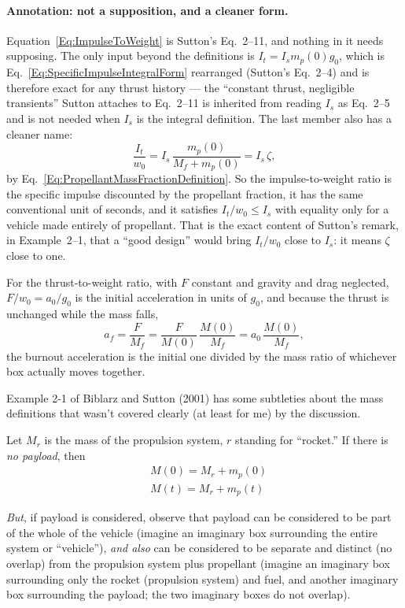 \paragraph*{Annotation: not a supposition, and a cleaner form.}
Equation~\ref{Eq:ImpulseToWeight} is Sutton's Eq.~2--11, and nothing in it
needs supposing. The only input beyond the definitions is
$I_t=I_sm_p(0)g_0$, which is Eq.~\ref{Eq:SpecificImpulseIntegralForm}
rearranged (Sutton's Eq.~2--4) and is therefore exact for any thrust
history --- the ``constant thrust, negligible transients'' Sutton attaches to
Eq.~2--11 is inherited from reading $I_s$ as Eq.~2--5 and is not needed when
$I_s$ is the integral definition. The last member also has a cleaner name:
\begin{equation}\label{Eq:ImpulseToWeightIsIsZeta}
 \frac{I_t}{w_0}
 =I_s\,\frac{m_p(0)}{M_f+m_p(0)}
 =I_s\,\zeta ,
\end{equation}
by Eq.~\ref{Eq:PropellantMassFractionDefinition}. So the impulse-to-weight
ratio is the specific impulse discounted by the propellant fraction, it has
the same conventional unit of seconds, and it satisfies $I_t/w_0\le I_s$ with
equality only for a vehicle made entirely of propellant. That is the exact
content of Sutton's remark, in Example~2--1, that a ``good design'' would
bring $I_t/w_0$ close to $I_s$: it means $\zeta$ close to one.

For the thrust-to-weight ratio, with $F$ constant and gravity and drag
neglected, $F/w_0=a_0/g_0$ is the initial acceleration in units of $g_0$, and
because the thrust is unchanged while the mass falls,
\begin{equation}\label{Eq:BurnoutAcceleration}
 a_f=\frac{F}{M_f}=\frac{F}{M(0)}\,\frac{M(0)}{M_f}
 =a_0\,\frac{M(0)}{M_f} ,
\end{equation}
the burnout acceleration is the initial one divided by the mass ratio of
whichever box actually moves together.

Example 2-1 of Biblarz and Sutton (2001) \cite{GSuttonOBiblarz2001} has some
subtleties about the mass definitions that wasn't covered clearly (at least
for me) by the discussion.

Let $M_r$ is the mass of the propulsion system, $r$ standing for ``rocket.''
If there is \emph{no payload}, then
\[
\begin{aligned}
& M(0) = M_r + m_p(0) \\
& M(t) = M_r + m_p(t)
\end{aligned}
\]

\emph{But}, if payload is considered, observe that payload can be considered
to be part of the whole of the vehicle (imagine an imaginary box surrounding
the entire system or ``vehicle''), \emph{and also} can be considered to be
separate and distinct (no overlap) from the propulsion system plus propellant
(imagine an imaginary box surrounding only the rocket (propulsion system) and
fuel, and another imaginary box surrounding the payload; the two imaginary
boxes do not overlap).

